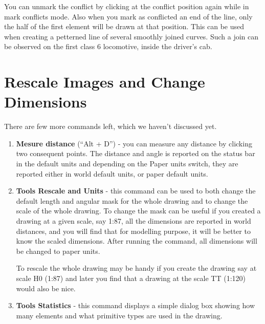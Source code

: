 You can unmark the conflict by clicking at the conflict position again
while in mark conflicts mode. Also when you mark as conflicted an end of
the line, only the half of the first element will be drawn at that position.
This can be used when creating a petterned line of several smoothly joined
curves. Such a join can be observed on the first class 6 locomotive, inside
the driver's cab.

\section{Rescale Images and Change Dimensions}

There are few more commands left, which we haven't discussed yet.
\begin{enumerate}
\item \textbf{Mesure distance} (``Alt + D'') - you can measure any distance
by clicking two consequent points. The distance and angle is reported on
the status bar in the default units and depending on the Paper units switch,
they are reported either in world default units, or paper default units.
\item \textbf{Tools \lar{} Rescale and Units} - this command can be used to
both change the default length and angular mask for the whole drawing and to
change the scale of the whole drawing. To change the mask can be useful if you
created a drawing at a given scale, say 1:87, all the dimensions are reported
in world distances, and you will find that for modelling purpose, it will be
better to know the scaled dimensions. After running the command, all dimensions
will be changed to paper units.

To rescale the whole drawing may be handy if you create the drawing say at
scale H0 (1:87) and later you find that a drawing at the scale TT (1:120) would
also be nice.
\item \textbf{Tools \lar{} Statistics} - this command displays a simple dialog box showing how
many elements and what primitive types are used in the drawing.
\end{enumerate}


